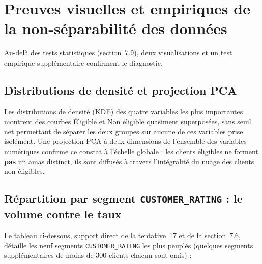 \documentclass[11pt,a4paper]{report}
\begin{document}
\section{Preuves visuelles et empiriques de la non-séparabilité des données}
\statutFait{}
Au-delà des tests statistiques (section~7.9), deux visualisations et un
test empirique supplémentaire confirment le diagnostic.

\subsection{Distributions de densité et projection PCA}
Les distributions de densité (KDE) des quatre variables les plus
importantes montrent des courbes \og Éligible \fg{} et \og Non éligible \fg{}
quasiment superposées, sans seuil net permettant de séparer les deux
groupes sur aucune de ces variables prise isolément. Une projection PCA à
deux dimensions de l'ensemble des variables numériques confirme ce
constat à l'échelle globale : les clients éligibles ne forment
\textbf{pas} un amas distinct, ils sont diffusés à travers l'intégralité
du nuage des clients non éligibles.



\subsection{Répartition par segment \texttt{CUSTOMER\_RATING} : le volume contre le taux}
\label{sec:segments}
Le tableau ci-dessous, support direct de la tentative~17 et de la
section~7.6, détaille les neuf segments \texttt{CUSTOMER\_RATING} les plus
peuplés (quelques segments supplémentaires de moins de 300 clients chacun
sont omis) :
\end{document}
